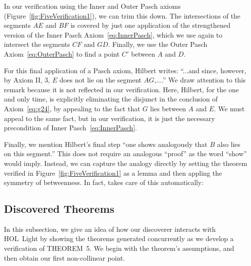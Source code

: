 In our verification using the Inner and Outer Pasch axioms (Figure~\ref{fig:FiveVerification1}), we can trim this down. The intersections of the segments $AE$ and $BF$ is covered by just one application of the strengthened version of the Inner Pasch Axiom~\eqref{eq:InnerPasch}, which we use again to intersect the segments $CF$ and $GD$. Finally, we use the Outer Pasch Axiom~\eqref{eq:OuterPasch} to find a point $C'$ between $A$ and $D$. 

For this final application of a Pasch axiom, Hilbert writes: ``...and since, however, by Axiom II, 3, $E$ does not lie on the segment $AG$,....'' We draw attention to this remark because it is not reflected in our verification. Here, Hilbert, for the one and only time, is explicitly eliminating the disjunct in the conclusion of Axiom~\ref{eq:g24}, by appealing to the fact that $G$ lies between $A$ and $E$. We must appeal to the same fact, but in our verification, it is just the necessary precondition of Inner Pasch~\eqref{eq:InnerPasch}.

Finally, we mention Hilbert's final step ``one shows analogously that $B$ also lies on this segment.'' This does not require an analogous ``proof'' as the word ``show'' would imply. Instead, we can capture the analogy directly by setting the theorem verified in Figure~\ref{fig:FiveVerification1} as a lemma and then appling the symmetry of betweenness. In fact,  takes care of this automatically:

\linebreak

\subsection{Discovered Theorems}
In this subsection, we give an idea of how our discoverer interacts with HOL~Light by showing the theorems generated concurrently as we develop a verification of THEOREM~5. We begin with the theorem's assumptions, and then obtain our first non-collinear point.

\linebreak

